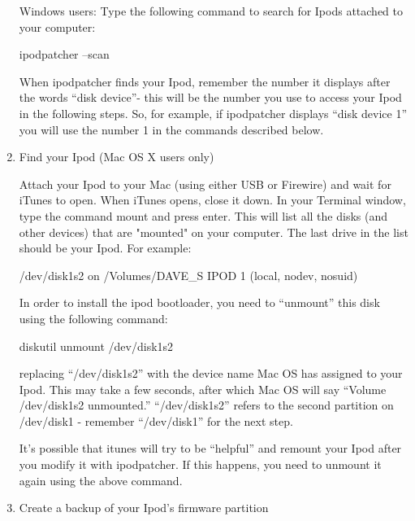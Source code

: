 \begin{enumerate}
    Windows users:  Type the following command to search for Ipods attached to 
    your computer: 
      \begin{code} 
        ipodpatcher --scan 
      \end{code}
    
    When ipodpatcher finds your Ipod, remember the number it displays after the 
    words ``disk device''- this will  be the number you use to access your Ipod 
    in the following steps.  So, for example, if ipodpatcher displays ``disk 
    device 1'' you will use the number 1 in the commands described below.


  \item Find your Ipod (Mac OS X users only)

    Attach your Ipod to your Mac (using either USB or Firewire) and wait for 
    iTunes to open. When iTunes opens, close it down.  In your Terminal window, 
    type the command mount and press enter. This will list all the disks (and 
    other devices) that are "mounted" on your computer. The last  drive in the 
    list should be your Ipod. For example: 
    \begin{code}
       /dev/disk1s2 on /Volumes/DAVE_S IPOD 1 (local, nodev, nosuid) 
    \end{code}

    In order to install the ipod bootloader, you need to ``unmount'' this disk 
    using the following command: 
      \begin{code} 
        diskutil unmount /dev/disk1s2 
      \end{code}
      
    replacing ``/dev/disk1s2'' with the device name Mac OS has assigned to your
    Ipod. This may take a few seconds, after which Mac OS will say ``Volume 
    /dev/disk1s2 unmounted.'' ``/dev/disk1s2'' refers to the second partition on 
    /dev/disk1 - remember   ``/dev/disk1'' for the next step.

    It's possible that itunes will try to be ``helpful'' and remount your Ipod 
    after you modify it with ipodpatcher. If this happens, you need to unmount 
    it again using the above command. 
  
  \item Create a backup of your Ipod's firmware partition


\end{enumerate}
